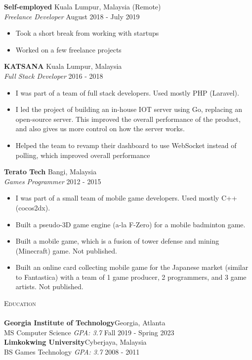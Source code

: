 \documentclass[a4paper]{article}
\newcommand{\lineunder} {
    \vspace*{-8pt} \\
    \hspace*{-18pt} \hrulefill \\
}
\newcommand{\header} [1] {
    {\hspace*{-18pt}\vspace*{6pt} \textsc{#1}}
    \vspace*{-6pt} \lineunder
}
\begin{document}
\textbf{Self-employed} \hfill Kuala Lumpur, Malaysia (Remote)\\
\textit{Freelance Developer} \hfill August 2018 - July 2019\\
\vspace{-1mm}
\begin{itemize} \itemsep 1pt
	\item Took a short break from working with startups
	\item Worked on a few freelance projects
\end{itemize}

\textbf{KATSANA} \hfill Kuala Lumpur, Malaysia\\
\textit{Full Stack Developer} \hfill 2016 - 2018\\
\vspace{-1mm}
\begin{itemize} \itemsep 1pt
	\item I was part of a team of full stack developers. Used mostly PHP (Laravel).
	\item I led the project of building an in-house IOT server using Go, replacing an open-source server. This improved the overall performance of the product, and also gives us more control on how the server works.
	\item Helped the team to revamp their dashboard to use WebSocket instead of polling, which improved overall performance
\end{itemize}

\textbf{Terato Tech} \hfill Bangi, Malaysia\\
\textit{Games Programmer} \hfill 2012 - 2015\\
\vspace{-1mm}
\begin{itemize} \itemsep 1pt
	\item I was part of a small team of mobile game developers. Used mostly C++ (cocos2dx).
	\item Built a pseudo-3D game engine (a-la F-Zero) for a mobile badminton game.
	\item Built a mobile game, which is a fusion of tower defense and mining (Minecraft) game. Not published.
	\item Built an online card collecting mobile game for the Japanese market (similar to Fantastica) with a team of 1 game producer, 2 programmers, and 3 game artists. Not published.
\end{itemize}

\pagebreak

\header{Education}
\textbf{Georgia Institute of Technology}\hfill Georgia, Atlanta\\
MS Computer Science \textit{GPA: 3.7} \hfill Fall 2019 - Spring 2023\\
\vspace{2mm}
\textbf{Limkokwing University}\hfill Cyberjaya, Malaysia\\
BS Games Technology \textit{GPA: 3.7} \hfill 2008 - 2011\\
\vspace{2mm}
\end{document}
